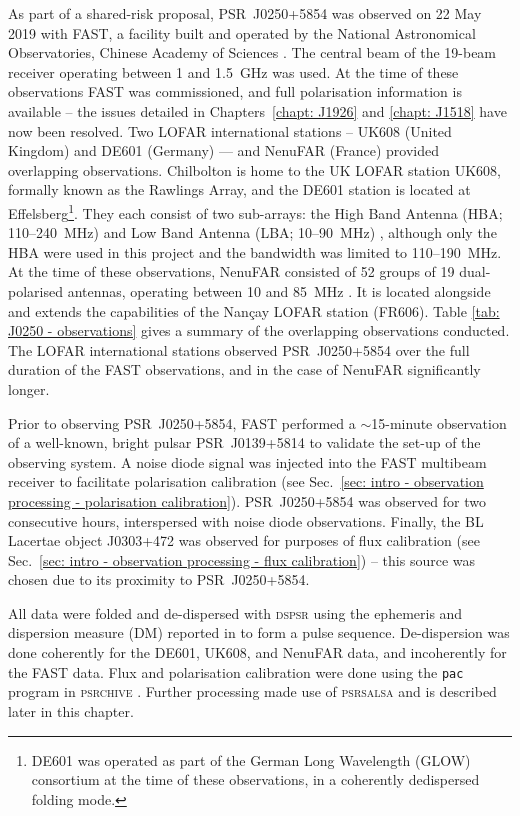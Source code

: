 As part of a shared-risk proposal, PSR~J0250+5854 was observed on 22 May 2019 with FAST, a facility built and operated by the National Astronomical Observatories, Chinese Academy of Sciences \citep{NLJ+2011,LWQ+2018}. The central beam of the 19-beam receiver operating between 1 and 1.5~GHz \citep{JTH+2020} was used. At the time of these observations FAST was commissioned, and full polarisation information is available -- the issues detailed in Chapters~\ref{chapt: J1926} and \ref{chapt: J1518} have now been resolved. Two LOFAR international stations -- UK608 (United Kingdom) and DE601 (Germany) --- and NenuFAR (France) provided overlapping observations. Chilbolton is home to the UK LOFAR station UK608, formally known as the Rawlings Array, and the DE601 station is located at Effelsberg\footnote{DE601 was operated as part of the German Long Wavelength (GLOW) consortium at the time of these observations, in a coherently dedispersed folding mode.}. They each consist of two sub-arrays: the High Band Antenna (HBA; 110--240~MHz) and Low Band Antenna (LBA; 10--90~MHz) \citep{HWG+2013,SHA+2011}, although only the HBA were used in this project and the bandwidth was limited to 110--190~MHz. At the time of these observations, NenuFAR consisted of 52 groups of 19 dual-polarised antennas, operating between 10 and 85~MHz \citep{ZDT+2020}. It is located alongside and extends the capabilities of the Nan\c{c}ay LOFAR station (FR606). Table \ref{tab: J0250 - observations} gives a summary of the overlapping observations conducted. The LOFAR international stations observed PSR~J0250+5854 over the full duration of the FAST observations, and in the case of NenuFAR significantly longer.

Prior to observing PSR~J0250+5854, FAST performed a $\sim$15-minute observation of a well-known, bright pulsar PSR~J0139+5814 to validate the set-up of the observing system. A noise diode signal was injected into the FAST multibeam receiver to facilitate polarisation calibration (see Sec.~\ref{sec: intro - observation processing - polarisation calibration}). PSR~J0250+5854 was observed for two consecutive hours, interspersed with noise diode observations. Finally, the BL Lacertae object J0303+472 \citep{VVxx2006} was observed for purposes of flux calibration (see Sec.~\ref{sec: intro - observation processing - flux calibration}) -- this source was chosen due to its proximity to PSR~J0250+5854.

All data were folded and de-dispersed with \textsc{dspsr} \citep{SBxx2011} using the ephemeris and dispersion measure (DM) reported in \citet{TBC+2018} to form a pulse sequence. De-dispersion was done coherently for the DE601, UK608, and NenuFAR data, and incoherently for the FAST data. Flux and polarisation calibration were done using the \texttt{pac} program in \textsc{psrchive} \citep{SMJR2010}. Further processing made use of \textsc{psrsalsa} \citep{Wxxx2016} and is described later in this chapter.

